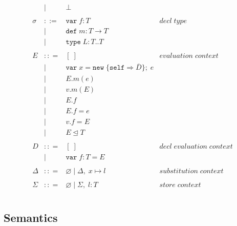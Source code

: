 \documentclass{llncs}
\begin{document}
\[\begin{array}{lll}
\begin{array}{lllr}
& | & \bot & \\
&&\\
\sigma & ::= & \texttt{var} \; f:T & decl \; type\\
       & |   & \texttt{def} \; m:T \rightarrow T \\
		 & |   & \texttt{type} \; L : T .. T &\\
&&\\
E & :: = & [\;] & evaluation \; context \\
       & | & \texttt{var} \; x = \texttt{new} \; \{\texttt{self} \Rightarrow \overline{D}\}; \; e& \\
       & | & E.m(e)\\
       & | & v.m(E)\\
       & | & E.f\\
       & | & E.f = e\\
       & | & v.f = E\\
       & | & E \unlhd T\\
&&\\
D & :: = & [\;] & decl \; evaluation \; context \\
       & | & \texttt{var} \; f : T = E\\
&&\\
\Delta & :: = & \varnothing \; | \; \Delta,\; x \mapsto l & substitution \; context \\
&&\\
\Sigma & :: = & \varnothing \; | \; \Sigma,\; l : T & store \; context \\
\end{array}
\end{array}
\]

\subsection{Semantics}











\end{document}
